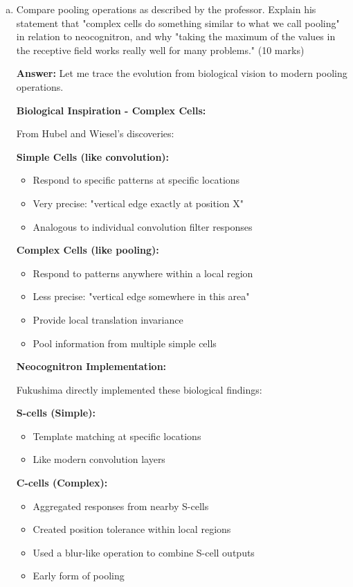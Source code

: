 \documentclass[12pt]{article}
\newcommand{\answer}[1]{{\color{answercolor}\textbf{Answer:} #1}}
\newcommand{\explanation}[1]{{\color{explanationcolor}#1}}
\begin{document}
\begin{enumerate}[(a)]
    \item Compare pooling operations as described by the professor. Explain his statement that "complex cells do something similar to what we call pooling" in relation to neocognitron, and why "taking the maximum of the values in the receptive field works really well for many problems." \hfill (10 marks)
    
    \answer{
    Let me trace the evolution from biological vision to modern pooling operations.
    
    \textbf{Biological Inspiration - Complex Cells:}
    
    \explanation{
    From Hubel and Wiesel's discoveries:
    
    \textbf{Simple Cells (like convolution):}
    \begin{itemize}
        \item Respond to specific patterns at specific locations
        \item Very precise: "vertical edge exactly at position X"
        \item Analogous to individual convolution filter responses
    \end{itemize}
    
    \textbf{Complex Cells (like pooling):}
    \begin{itemize}
        \item Respond to patterns anywhere within a local region
        \item Less precise: "vertical edge somewhere in this area"
        \item Provide local translation invariance
        \item Pool information from multiple simple cells
    \end{itemize}
    }
    
    \textbf{Neocognitron Implementation:}
    
    \explanation{
    Fukushima directly implemented these biological findings:
    
    \textbf{S-cells (Simple):}
    \begin{itemize}
        \item Template matching at specific locations
        \item Like modern convolution layers
    \end{itemize}
    
    \textbf{C-cells (Complex):}
    \begin{itemize}
        \item Aggregated responses from nearby S-cells
        \item Created position tolerance within local regions
        \item Used a blur-like operation to combine S-cell outputs
        \item Early form of pooling
    \end{itemize}
    }
    
}
\end{enumerate}
\end{document}
